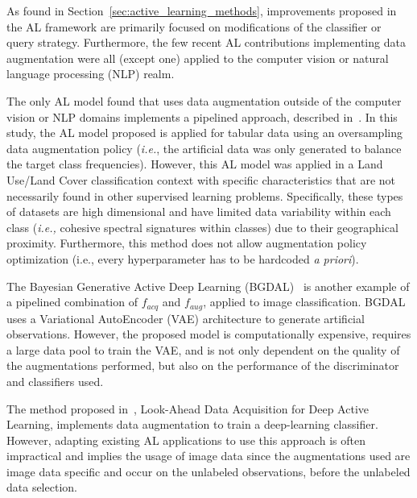 \documentclass[parskip=full]{scrartcl}
\begin{document}
As found in Section~\ref{sec:active_learning_methods}, improvements proposed
in the AL framework are primarily focused on modifications of the classifier
or query strategy. Furthermore, the few recent AL contributions implementing
data augmentation were all (except one) applied to the computer vision or
natural language processing (NLP) realm. 

The only AL model found that uses data augmentation outside of the computer
vision or NLP domains implements a pipelined approach, described
in~\cite{Fonseca2021}. In this study, the AL model proposed is applied for
tabular data using an oversampling data augmentation policy (\textit{i.e.},
the artificial data was only generated to balance the target class
frequencies). However, this AL model was applied in a Land Use/Land Cover
classification context with specific characteristics that are not necessarily
found in other supervised learning problems. Specifically, these types of
datasets are high dimensional and have limited data variability within each
class (\textit{i.e.,} cohesive spectral signatures within classes) due to
their geographical proximity. Furthermore, this method does not allow
augmentation policy optimization (i.e., every hyperparameter has to be
hardcoded \textit{a priori}).

The Bayesian Generative Active Deep Learning (BGDAL)~\cite{tran2019bayesian}
is another example of a pipelined combination of $f_{acq}$ and $f_{aug}$,
applied to image classification. BGDAL uses a Variational AutoEncoder (VAE)
architecture to generate artificial observations. However, the proposed model
is computationally expensive, requires a large data pool to train the VAE, and
is not only dependent on the quality of the augmentations performed, but also
on the performance of the discriminator and classifiers used.

The method proposed in~\cite{Kim2021}, Look-Ahead Data Acquisition for Deep
Active Learning, implements data augmentation to train a deep-learning
classifier. However, adapting existing AL applications to use this approach is
often impractical and implies the usage of image data since the augmentations
used are image data specific and occur on the unlabeled observations, before
the unlabeled data selection.
\end{document}
